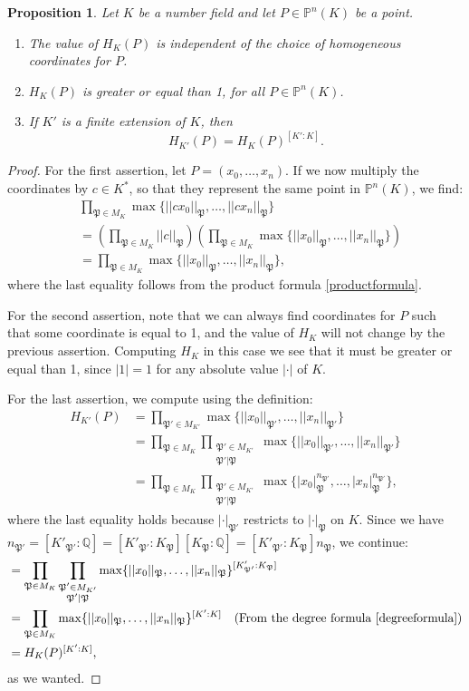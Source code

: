 \documentclass[a4paper, 12pt]{amsart}
\theoremstyle{definition}
\theoremstyle{plain}
\newtheorem{prop0}[defn0]{Proposition}
\theoremstyle{plain}
\theoremstyle{plain}
\theoremstyle{plain}
\theoremstyle{remark}
\theoremstyle{remark}
\theoremstyle{plain}
\newenvironment{proposition}{ \begin{prop0}}{\end{prop0}}
\newcommand{\Q}{\mathbb{Q}}
\renewcommand{\P}{\mathfrak{P}}
\begin{document}
	\begin{proposition}
		Let $K$ be a number field and let $P\in\mathbb{P}^n(K)$ be a point.
		\begin{enumerate}
			\item The value of $H_K(P)$ is independent of the choice of homogeneous coordinates for $P$.
			\item $H_K(P)$ is greater or equal than 1, for all $P\in\mathbb{P}^n(K)$.
			\item If $K'$ is a finite extension of $K$, then
			\begin{equation*}
				H_{K'}(P)=H_K(P)^{[K':K]}.
			\end{equation*}
		\end{enumerate}
	\end{proposition}
	\begin{proof}
	For the first assertion, let $P=(x_0,\ldots,x_n)$. If we now multiply the coordinates by $c\in K^*$, so that they represent the same point in $\mathbb{P}^n(K)$, we find:
	\begin{align*}
		&\prod_{\P\in M_K}\max\{||cx_0||_\P,\ldots,||cx_n||_\P\}\\
		&=\left(\prod_{\P\in M_K}||c||_\P\right) \left(\prod_{\P\in M_K}\max\{||x_0||_\P,\ldots,||x_n||_\P\}\right)\\
		&=\prod_{\P\in M_K}\max\{||x_0||_\P,\ldots,||x_n||_\P\},
	\end{align*}
	where the last equality follows from the product formula \eqref{productformula}.
	
	For the second assertion, note that we can always find coordinates for $P$ such that some coordinate is equal to 1, and the value of $H_K$ will not change by the previous assertion. Computing $H_K$ in this case we see that it must be greater or equal than 1, since $|1|=1$ for any absolute value $|\cdot|$ of $K$.
	
	For the last assertion, we compute using the definition:
	\begin{align*}
		H_{K'}(P)&=\prod_{\P'\in M_{K'}}\max\{||x_0||_{\P'},\ldots,||x_n||_{\P'}\}\\
		&=\prod_{\P\in M_K}\prod_{\substack{\P'\in M_{K'}\\\P'|\P}}\max\{||x_0||_{\P'},\ldots,||x_n||_{\P'}\}\\
		&=\prod_{\P\in M_K}\prod_{\substack{\P'\in M_{K'}\\\P'|\P}}\max\{|x_0|^{n_{\P'}}_{\P},\ldots,|x_n|^{n_{\P'}}_{\P}\},
	\end{align*}
	where the last equality holds because $|\cdot|_{\P'}$ restricts to $|\cdot|_\P$ on $K$. Since we have $n_{\P'}=[K'_{\P'}:\Q]=[K'_{\P'}:K_\P][K_\P:\Q]=[K'_{\P'}:K_\P]n_\P$, we continue:
	\begin{align*}
		&=\prod_{\P\in M_K}\prod_{\substack{\P'\in M_{K'}\\\P'|\P}}\max\{||x_0||_\P,\ldots,||x_n||_\P\}^{[K'_{\P'}:K_\P]}\\
		&=\prod_{\P\in M_K}\max\{||x_0||_\P,\ldots,||x_n||_\P\}^{[K':K]}\quad(\text{From the degree formula \eqref{degreeformula}})\\
		&=H_K(P)^{[K':K]},
	\end{align*}
	as we wanted.
	\end{proof}
\end{document}

